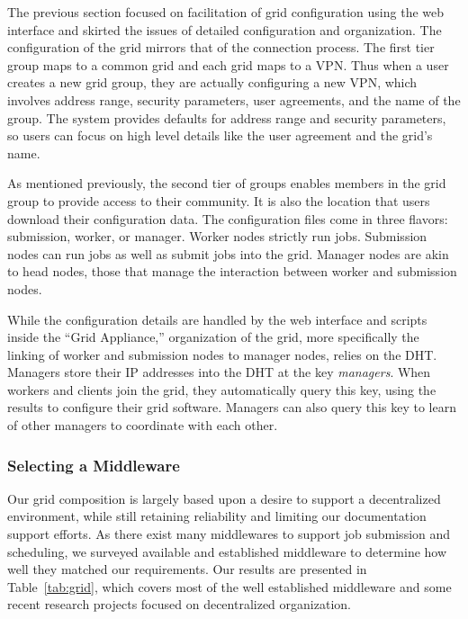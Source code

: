 \documentclass[twocolumn]{svjour3}
\begin{document}
The previous section focused on facilitation of grid configuration using the
web interface and skirted the issues of detailed configuration and
organization.  The configuration of the grid mirrors that of the connection
process.  The first tier group maps to a common grid and each grid maps to a
VPN.  Thus when a user creates a new grid group, they are actually configuring
a new VPN, which involves address range, security parameters, user agreements,
and the name of the group.  The system provides defaults for address range and
security parameters, so users can focus on high level details like the user
agreement and the grid's name.

As mentioned previously, the second tier of groups enables members in the grid
group to provide access to their community.  It is also the location that users
download their configuration data.  The configuration files come in three
flavors: submission, worker, or manager.  Worker nodes strictly run jobs.
Submission nodes can run jobs as well as submit jobs into the grid.  Manager
nodes are akin to head nodes, those that manage the interaction between worker
and submission nodes.

While the configuration details are handled by the web interface and scripts
inside the ``Grid Appliance,'' organization of the grid, more specifically the
linking of worker and submission nodes to manager nodes, relies on the DHT.
Managers store their IP addresses into the DHT at the key \emph{managers}.
When workers and clients join the grid, they automatically query this key,
using the results to configure their grid software.  Managers can also query
this key to learn of other managers to coordinate with each other.

\subsubsection{Selecting a Middleware}

\addtocounter{footnote}{1}
\addtocounter{footnote}{1}
\addtocounter{footnote}{1}

Our grid composition is largely based upon a desire to support a decentralized
environment, while still retaining reliability and limiting our documentation
support efforts.  As there exist many middlewares to support job submission and
scheduling, we surveyed available and established middleware to determine how
well they matched our requirements.  Our results are presented in
Table~\ref{tab:grid}, which covers most of the well established middleware and
some recent research projects focused on decentralized organization.
\end{document}
